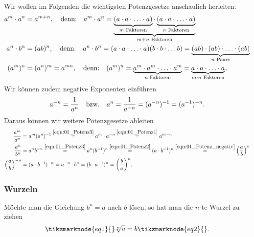 Wir wollen im Folgenden die wichtigsten Potenzgesetze anschaulich herleiten: 
\begin{align}
    a^m \cdot a^n &= a^{m+n}, \qq{denn:} a^m \cdot a^n = \underbrace{\underbrace{(a\cdot a \cdot \hdots \cdot a)}_{m \text{ Faktoren}} \cdot \underbrace{(a\cdot a \cdot \hdots \cdot a)}_{n \text{ Faktoren}}}_{m+n \text{ Faktoren}}\label{eqn:01_Potenz1}\\
    a^n \cdot b^n &= (ab)^n, \qq{denn:} a^n \cdot b^n = (a \cdot a \cdot \hdots \cdot a)(b \cdot b \cdot \hdots b) = \underbrace{(ab)\cdot (ab) \cdot \hdots \cdot (ab)}_{n \text{ Paare}}\label{eqn:01_Potenz2} \\
    (a^m)^n &= (a^n)^m = a^{mn}, \qq{denn:} (a^m)^n = \underbrace{a^m \cdot a^m \cdot \hdots \cdot a^m}_{n \text{ Faktoren}} = \underbrace{a \cdot a \cdot \hdots \cdot a}_{m\cdot n \text{ Faktoren}}.\label{eqn:01_Potenz3}
\end{align}
Wir können zudem negative Exponenten einführen 
\begin{align}
    a^{-n} = \frac{1}{a^n} \qq{bzw.} a^n = \frac{1}{a^{-n}} = (a^{-n})^{-1} = (a^{-1})^{-n}.\label{eqn:01_Potenz_negativ}
\end{align}
Daraus können wir weitere Potenzgesetze ableiten 
\begin{align}
    \frac{a^m}{a^n} &= a^m (a^n)^{-1} \overset{\eqref{eqn:01_Potenz3}}{=} a^m \cdot a^{-n}  \overset{\eqref{eqn:01_Potenz1}}{=} a^{m-n} \\ 
    \frac{a^n}{b^n} &= a^n b^{-n} \overset{\eqref{eqn:01_Potenz3}}{=} a^n (b^{-1})^n  \overset{\eqref{eqn:01_Potenz2}}{=} (a\cdot b^{-1})^n  \overset{\eqref{eqn:01_Potenz_negativ}}{=} \qty(\frac{a}{b})^n \\
    \qty(\frac{a}{b})^{-n} &= (a \cdot b^{-1})^{-n} = a^{-n} \cdot b^n = (b \cdot a^{-1})^n = \qty(\frac{b}{a})^n.
\end{align}

\subsubsection{Wurzeln}
Möchte man die Gleichung $b^n = a$ nach $b$ lösen, so hat man die $n$-te Wurzel zu ziehen
\begin{align}
     \tikzmarknode{eq1}{}\sqrt[n]{a}= b\tikzmarknode{eq2}{}.
\end{align}

